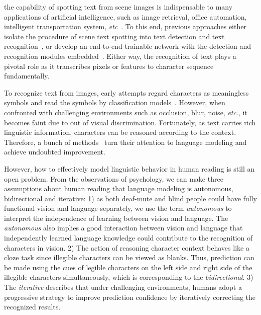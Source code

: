 \documentclass[10pt,journal,compsoc]{IEEEtran}
\def\etc{{\it etc}\xspace}
\begin{document}
\maketitle


\IEEEdisplaynontitleabstractindextext

\IEEEpeerreviewmaketitle





 the capability of spotting text from scene images is indispensable to many applications of artificial intelligence, such as image retrieval, office automation, intelligent transportation system, \etc~\cite{ye2014text,long2020scene,wan2020vocabulary}. To this end, previous approaches either isolate the procedure of scene text spotting into text detection and text recognition~\cite{jaderberg2016reading}, or develop an end-to-end trainable network with the detection and recognition modules embedded~\cite{wang2021towards,liu2020abcnetv2}. Either way, the recognition of text plays a pivotal role as it transcribes pixels or features to character sequence fundamentally.


To recognize text from images, early attempts regard characters as meaningless symbols and read the symbols by classification models~\cite{wang2011end, jaderberg2016reading, lyu2018mask}. However, when confronted with challenging environments such as occlusion, blur, noise, \etc., it becomes faint due to out of visual discrimination. Fortunately, as text carries rich linguistic information, characters can be reasoned according to the context. Therefore, a bunch of methods~\cite{jaderberg2014deep,jaderberg2015deep,qiao2020seed, liao2020mask} turn their attention to language modeling and achieve undoubted improvement.


However, how to effectively model linguistic behavior in human reading is still an open problem. From the observations of psychology, we can make three assumptions about human reading that language modeling is autonomous, bidirectional and iterative: 1) as both deaf-mute and blind people could have fully functional vision and language separately, we use the term \emph{autonomous} to interpret the independence of learning between vision and language. The \emph{autonomous} also implies a good interaction between vision and language that independently learned language knowledge could contribute to the recognition of characters in vision. 2) The action of reasoning character context behaves like a cloze task since illegible characters can be viewed as blanks. Thus, prediction can be made using the cues of legible characters on the left side and right side of the illegible characters simultaneously, which is corresponding to the \emph{bidirectional}. 3) The \emph{iterative} describes that under challenging environments, humans adopt a progressive strategy to improve prediction confidence by iteratively correcting the recognized results. 
\end{document}
